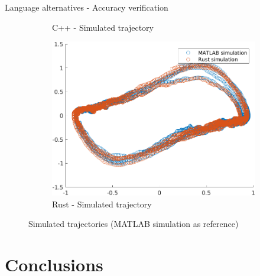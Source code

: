 \documentclass{beamer}
\begin{document}
\begin{frame}{Language alternatives - Accuracy verification}
\begin{figure}
\begin{subfigure}[b]{0.3\textwidth}
            \caption{C++ - Simulated trajectory}
            \label{fig:sim_cpp}
        \end{subfigure}
        \hfill
        \begin{subfigure}[b]{0.3\textwidth}
            \centering
            \includegraphics[width=\textwidth]{Rust_Sim.png}
            \caption{Rust - Simulated trajectory}
            \label{fig:sim_rust}
        \end{subfigure}
        \caption{Simulated trajectories (MATLAB simulation as reference)}
        \label{fig:implementations}
    \end{figure}
\end{frame}


\section{Conclusions}
\end{document}

